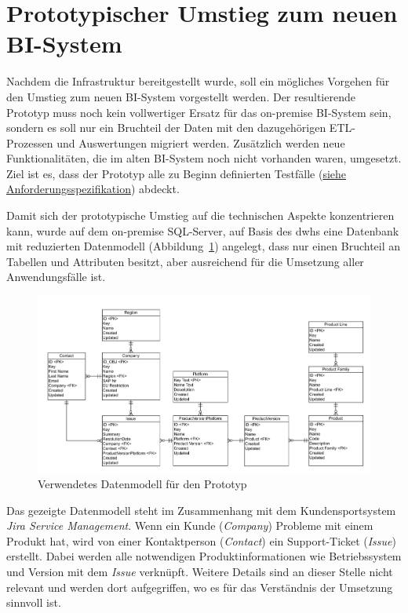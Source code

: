 \section{Prototypischer Umstieg zum neuen BI-System} \label{sec:praktischeUmsetzung:Migration}
Nachdem die Infrastruktur bereitgestellt wurde, soll ein mögliches Vorgehen für den Umstieg zum neuen BI-System vorgestellt werden. Der resultierende Prototyp muss noch kein vollwertiger Ersatz für das on-premise BI-System sein, sondern es soll nur ein Bruchteil der Daten mit den dazugehörigen ETL-Prozessen und Auswertungen migriert werden. Zusätzlich werden neue Funktionalitäten, die im alten BI-System noch nicht vorhanden waren, umgesetzt. Ziel ist es, dass der Prototyp alle zu Beginn definierten Testfälle (\hyperref[sec:anforderungsspezifikation:funktionaleAnforderungen]{siehe Anforderungsspezifikation}) abdeckt.

Damit sich der prototypische Umstieg auf die technischen Aspekte konzentrieren kann, wurde auf dem on-premise SQL-Server, auf Basis des \acp{dwh} eine Datenbank mit reduzierten Datenmodell (Abbildung~\ref{fig:praktischeUmsetzung:dataModel}) angelegt, dass nur einen Bruchteil an Tabellen und Attributen besitzt, aber ausreichend für die Umsetzung aller Anwendungsfälle ist. 

\begin{figure}[htbp]
 \centering
 \includegraphics[width=\textwidth]{gfx/data_model.png}
 \caption{Verwendetes Datenmodell für den Prototyp}
\label{fig:praktischeUmsetzung:dataModel}
\end{figure}

\noindent Das gezeigte Datenmodell steht im Zusammenhang mit dem Kundensportsystem \textit{Jira Service Management}. Wenn ein Kunde (\textit{Company}) Probleme mit einem Produkt hat, wird von einer Kontaktperson (\textit{Contact}) ein Support-Ticket (\textit{Issue}) erstellt. Dabei werden alle notwendigen Produktinformationen wie Betriebssystem und Version mit dem \textit{Issue} verknüpft. Weitere Details sind an dieser Stelle nicht relevant und werden dort aufgegriffen, wo es für das Verständnis der Umsetzung sinnvoll ist.

